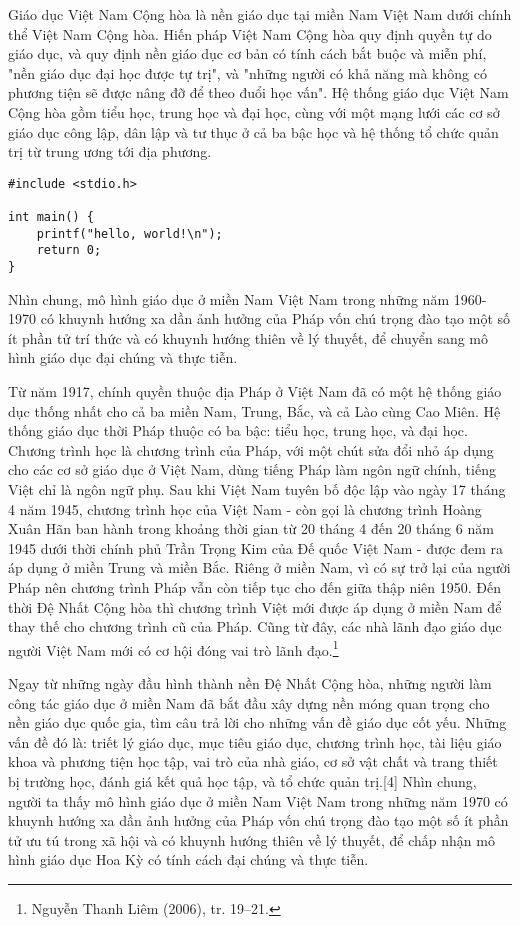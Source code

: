 \documentclass[../thesis.tex]{subfiles}
\begin{document}
Giáo dục Việt Nam Cộng hòa là nền giáo dục tại miền Nam Việt Nam dưới chính thể Việt Nam Cộng hòa.
Hiến pháp Việt Nam Cộng hòa quy định quyền tự do giáo dục, và quy định nền giáo dục cơ bản có tính cách bắt buộc và miễn phí, "nền giáo dục đại học được tự trị", và "những người có khả năng mà không có phương tiện sẽ được nâng đỡ để theo đuổi học vấn". Hệ thống giáo dục Việt Nam Cộng hòa gồm tiểu học, trung học và đại học, cùng với một mạng lưới các cơ sở giáo dục công lập, dân lập và tư thục ở cả ba bậc học và hệ thống tổ chức quản trị từ trung ương tới địa phương.

\begin{lstlisting}
#include <stdio.h>

int main() {
	printf("hello, world!\n");
	return 0;
}
\end{lstlisting}

Nhìn chung, mô hình giáo dục ở miền Nam Việt Nam trong những năm 1960-1970 có khuynh hướng xa dần ảnh hưởng của Pháp vốn chú trọng đào tạo một số ít phần tử trí thức và có khuynh hướng thiên về lý thuyết, để chuyển sang mô hình giáo dục đại chúng và thực tiễn.

Từ năm 1917, chính quyền thuộc địa Pháp ở Việt Nam đã có một hệ thống giáo dục thống nhất cho cả ba miền Nam, Trung, Bắc, và cả Lào cùng Cao Miên. Hệ thống giáo dục thời Pháp thuộc có ba bậc: tiểu học, trung học, và đại học. Chương trình học là chương trình của Pháp, với một chút sửa đổi nhỏ áp dụng cho các cơ sở giáo dục ở Việt Nam, dùng tiếng Pháp làm ngôn ngữ chính, tiếng Việt chỉ là ngôn ngữ phụ. Sau khi Việt Nam tuyên bố độc lập vào ngày 17 tháng 4 năm 1945, chương trình học của Việt Nam - còn gọi là chương trình Hoàng Xuân Hãn ban hành trong khoảng thời gian từ 20 tháng 4 đến 20 tháng 6 năm 1945 dưới thời chính phủ Trần Trọng Kim của Đế quốc Việt Nam - được đem ra áp dụng ở miền Trung và miền Bắc. Riêng ở miền Nam, vì có sự trở lại của người Pháp nên chương trình Pháp vẫn còn tiếp tục cho đến giữa thập niên 1950. Đến thời Đệ Nhất Cộng hòa thì chương trình Việt mới được áp dụng ở miền Nam để thay thế cho chương trình cũ của Pháp. Cũng từ đây, các nhà lãnh đạo giáo dục người Việt Nam mới có cơ hội đóng vai trò lãnh đạo.\footnote{Nguyễn Thanh Liêm (2006), tr. 19–21.}

Ngay từ những ngày đầu hình thành nền Đệ Nhất Cộng hòa, những người làm công tác giáo dục ở miền Nam đã bắt đầu xây dựng nền móng quan trọng cho nền giáo dục quốc gia, tìm câu trả lời cho những vấn đề giáo dục cốt yếu. Những vấn đề đó là: triết lý giáo dục, mục tiêu giáo dục, chương trình học, tài liệu giáo khoa và phương tiện học tập, vai trò của nhà giáo, cơ sở vật chất và trang thiết bị trường học, đánh giá kết quả học tập, và tổ chức quản trị.[4] Nhìn chung, người ta thấy mô hình giáo dục ở miền Nam Việt Nam trong những năm 1970 có khuynh hướng xa dần ảnh hưởng của Pháp vốn chú trọng đào tạo một số ít phần tử ưu tú trong xã hội và có khuynh hướng thiên về lý thuyết, để chấp nhận mô hình giáo dục Hoa Kỳ có tính cách đại chúng và thực tiễn.
\end{document}
